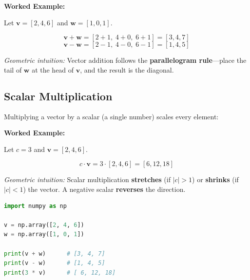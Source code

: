 \documentclass[11pt,a4paper]{article}
\begin{document}
\medskip\noindent\textbf{Worked Example:}

Let $\mathbf{v} = [2, 4, 6]$ and $\mathbf{w} = [1, 0, 1]$.

\[
\mathbf{v} + \mathbf{w} = [2+1,\; 4+0,\; 6+1] = [3, 4, 7]
\]
\[
\mathbf{v} - \mathbf{w} = [2-1,\; 4-0,\; 6-1] = [1, 4, 5]
\]

\begin{center}
\end{center}

\textit{Geometric intuition:} Vector addition follows the \textbf{parallelogram rule}---place the tail of $\mathbf{w}$ at the head of $\mathbf{v}$, and the result is the diagonal.

\subsection{Scalar Multiplication}

Multiplying a vector by a scalar (a single number) scales every element:

\medskip\noindent\textbf{Worked Example:}

Let $c = 3$ and $\mathbf{v} = [2, 4, 6]$.

\[
c \cdot \mathbf{v} = 3 \cdot [2, 4, 6] = [6, 12, 18]
\]

\textit{Geometric intuition:} Scalar multiplication \textbf{stretches} (if $|c| > 1$) or \textbf{shrinks} (if $|c| < 1$) the vector. A negative scalar \textbf{reverses} the direction.

\begin{lstlisting}[language=Python]
import numpy as np

v = np.array([2, 4, 6])
w = np.array([1, 0, 1])

print(v + w)      # [3, 4, 7]
print(v - w)      # [1, 4, 5]
print(3 * v)      # [ 6, 12, 18]
\end{lstlisting}
\end{document}
